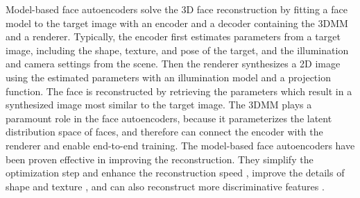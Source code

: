 \documentclass[10pt,twocolumn,letterpaper]{article}
\begin{document}
Model-based face autoencoders \cite{tewari2017mofa} solve the 3D face reconstruction by fitting a face model to the target image with an encoder and a decoder containing the 3DMM and a renderer. Typically, the encoder first estimates parameters from a target image, including the shape, texture, and pose of the target, and the illumination and camera settings from the scene. Then the renderer synthesizes a 2D image using the estimated parameters with an illumination model and a projection function. The face is reconstructed by retrieving the parameters which result in a synthesized image most similar to the target image. The 3DMM \cite{blanz2003face} plays a paramount role in the face autoencoders, because it parameterizes the latent distribution space of faces, and therefore can connect the encoder with the renderer and enable end-to-end training.
The model-based face autoencoders have been proven effective in improving the reconstruction. They simplify the optimization step and enhance the reconstruction speed \cite{Tewari_2018_CVPR}, improve the details of shape and texture \cite{DECA,Gecer_2019_CVPR,Richardson_2017_CVPR,8578512,tran2019towards}, and can also reconstruct more discriminative features \cite{deng2019accurate,genova2018unsupervised}. 
\end{document}
